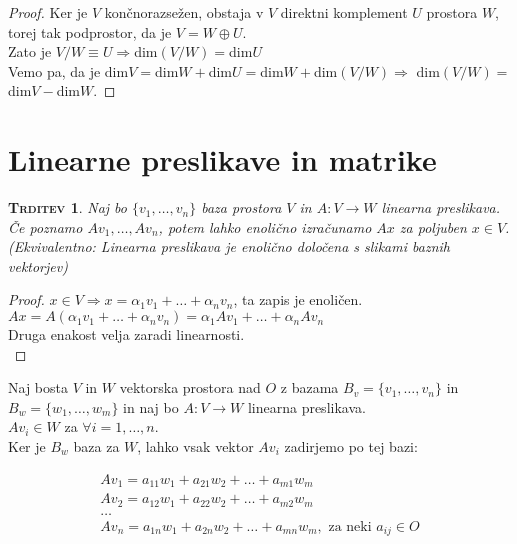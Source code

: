 \documentclass[a4paper,12pt]{article}
\newtheorem*{trditev}{\textsc{Trditev}}
\begin{document}
\begin{proof}
	Ker je $V$ končnorazsežen, obstaja v $V$ direktni komplement $U$ prostora $W$, torej tak podprostor, da je $V=W\oplus U$. \\

	Zato je $V/W\equiv U\Rightarrow$dim$(V/W)=$dim$U$ \\

	Vemo pa, da je dim$V=$dim$W+$dim$U=$dim$W+$dim$(V/W) \Rightarrow$ dim$(V/W)=$dim$V-$dim$W$.
\end{proof}

\newpage

\section{Linearne preslikave in matrike}

\begin{trditev}
	Naj bo $\{v_1,\ldots,v_n\}$ baza prostora $V$ in $A:V\to W$ linearna preslikava. Če poznamo $A v_1,\ldots,A v_n$, potem lahko enolično izračunamo $Ax$ za poljuben $x\in V$. (Ekvivalentno: Linearna preslikava je enolično določena s slikami baznih vektorjev)\\
\end{trditev}

\begin{proof}
	$x\in V \Rightarrow x=\alpha_1 v_1+\ldots+\alpha_n v_n$, ta zapis je enoličen.\\

	$Ax=A(\alpha_1 v_1+\ldots+\alpha_n v_n)=\alpha_1 Av_1+\ldots+\alpha_n Av_n$ \\

	Druga enakost velja zaradi linearnosti.\\
\end{proof}

Naj bosta $V$ in $W$ vektorska prostora nad $O$ z bazama $B_v=\{v_1,\ldots,v_n\}$ in \linebreak $B_w=\{w_1,\ldots,w_m\}$ in naj bo $A:V\to W$ linearna preslikava. \\

$Av_i\in W$ za $\forall i =1,\ldots,n$. \\

Ker je $B_w$ baza za $W$, lahko vsak vektor $Av_i$ zadirjemo po tej  bazi:

\begin{gather*}
	Av_1=a_{11}w_1+a_{21}w_2+\ldots+a_{m1}w_m \\
	Av_2=a_{12}w_1+a_{22}w_2+\ldots+a_{m2}w_m \\
	\ldots \\
	Av_n=a_{1n}w_1+a_{2n}w_2+\ldots+a_{mn}w_m,\text{ za neki }a_{ij}\in O
\end{gather*}
\end{document}
